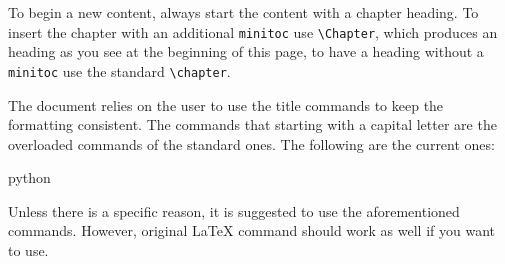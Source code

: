 \documentclass[minted, draw]{../tex/hebdomon}
\begin{document}
To begin a new content, always start the content with a chapter heading. To
insert the chapter with an additional \lstinline[columns=fixed]{minitoc}
use \lstinline[columns=fixed]{\Chapter}, which produces an heading as
you see at the beginning of this page, to have a heading without
a \lstinline[columns=fixed]{minitoc} use the standard
\lstinline[columns=fixed]{\chapter}.

The document relies on the user to use the  title commands to
keep the formatting consistent. The commands that starting with a
capital letter are the overloaded commands of the standard ones.
The following are the current ones:
%
\begin{code}{python}
\end{code}
%
\begin{warning}
	Unless there is a specific reason, it is suggested to use the aforementioned
	commands. However, original LaTeX command should work as well if you want to use.
\end{warning}

\end{document}
